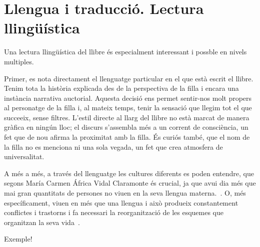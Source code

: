 \section{Llengua i traducció. Lectura llingüística}

Una lectura llingüística del llibre és especialment interessant i possble en nivels multiples.

Primer, es nota directament el llenguatge particular en el que està escrit el llibre.
Tenim tota la història explicada des de la perspectiva de la filla i encara una instància narrativa auctorial.
Aquesta decisió ens permet sentir-nos molt propers al personatge de la filla i, al mateix temps, tenir la sensació que llegim tot el que succeeix, sense filtres.
L'estil directe al llarg del llibre no està marcat de manera gràfica en ningún lloc; el discurs s'assembla més a un corrent de consciència, un fet que de nou afirma la proximitat amb la filla.
És curiós també, que el nom de la filla no es menciona ni una sola vegada, un fet que crea atmosfera de universalitat.


A més a més, a través del llenguatge les cultures diferents es poden entendre, que segons María Carmen África Vidal Claramonte és crucial, ja que avui dia més que mai gran quantitats de persones no viuen en la seva llengua materna.~\autocite{Vidal2012}.
O, més específicament, viuen en més que una llengua i això produeix constantement conflictes i trastorns i fa necessari la reorganització de les esquemes que organitzan la seva vida~\autocite{Albin2005}.

Exemple!


